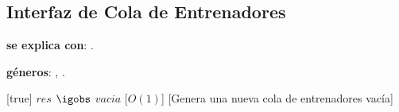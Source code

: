 \begin{Interfaz}
\subsection{Interfaz de Cola de Entrenadores}

\textbf{se explica con}: .

\textbf{g\'eneros}: , .


%
[true]   %
{$res$ $\igobs$ $vacia$} %
[$O(1)$]   %
[Genera una nueva cola de entrenadores vac\'ia]  %

\end{Interfaz}